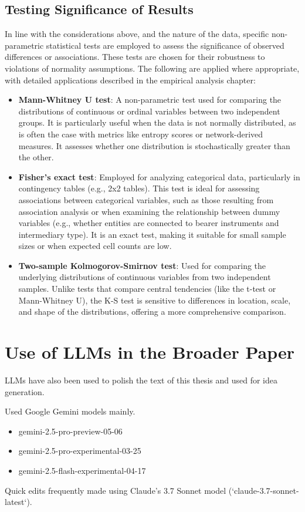 \subsection{Testing Significance of Results}
\label{subsec:significance_testing}
In line with the considerations above, and the nature of the data, specific non-parametric statistical tests are employed to assess the significance of observed differences or associations. These tests are chosen for their robustness to violations of normality assumptions. The following are applied where appropriate, with detailed applications described in the empirical analysis chapter:
\begin{itemize}
    \item \textbf{Mann-Whitney U test}: A non-parametric test used for comparing the distributions of continuous or ordinal variables between two independent groups. It is particularly useful when the data is not normally distributed, as is often the case with metrics like entropy scores or network-derived measures. It assesses whether one distribution is stochastically greater than the other.
    \item \textbf{Fisher's exact test}: Employed for analyzing categorical data, particularly in contingency tables (e.g., 2x2 tables). This test is ideal for assessing associations between categorical variables, such as those resulting from association analysis or when examining the relationship between dummy variables (e.g., whether entities are connected to bearer instruments and intermediary type). It is an exact test, making it suitable for small sample sizes or when expected cell counts are low.
    \item \textbf{Two-sample Kolmogorov-Smirnov test}: Used for comparing the underlying distributions of continuous variables from two independent samples. Unlike tests that compare central tendencies (like the t-test or Mann-Whitney U), the K-S test is sensitive to differences in location, scale, and shape of the distributions, offering a more comprehensive comparison.
\end{itemize}


\section{Use of LLMs in the Broader Paper}
\label{sec:3_5_llms}

LLMs have also been used to polish the text of this thesis and used for idea generation.

Used Google Gemini models mainly.
\begin{itemize}
    \item gemini-2.5-pro-preview-05-06
    \item gemini-2.5-pro-experimental-03-25
    \item gemini-2.5-flash-experimental-04-17
\end{itemize}

Quick edits frequently made using Claude's 3.7 Sonnet model (`claude-3.7-sonnet-latest`).



